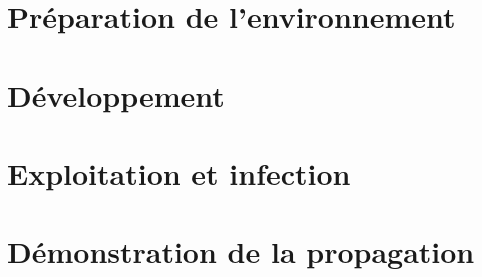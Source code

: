 
\section{Préparation de l'environnement}

\section{Développement}

\section{Exploitation et infection}

\section{Démonstration de la propagation}
